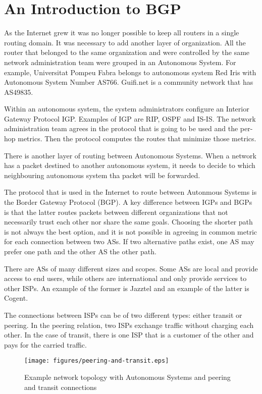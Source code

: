 \chapter{An Introduction to BGP}

As the Internet grew it was no longer possible to keep all routers in a single routing domain.
It was necessary to add another layer of organization.
All the router that belonged to the same organization and were controlled by the same network administration team were grouped in an Autonomous System.
For example, Universitat Pompeu Fabra belongs to autonomous system Red Iris with Autonomous System Number AS766.
Guifi.net is a community network that has AS49835.

Within an autonomous system, the system administrators configure an Interior Gateway Protocol IGP.
Examples of IGP are RIP, OSPF and IS-IS.
The network administration team agrees in the protocol that is going to be used and the per-hop metrics.
Then the protocol computes the routes that minimize those metrics.

There is another layer of routing between Autonomous Systems.
When a network has a packet destined to another autonomous system, it needs to decide to which neighbouring autonomous system tha packet will be forwarded.

The protocol that is used in the Internet to route between Autonmous Systems is the Border Gateway Protocol (BGP).
A key difference between IGPs and BGPs is that the latter routes packets between different organizations that not necessarily trust each other nor share the same goals.
Choosing the shorter path is not always the best option, and it is not possible in agreeing in common metric for each connection between two ASs.
If two alternative paths exist, one AS may prefer one path and the other AS the other path.

There are ASs of many different sizes and scopes.
Some ASs are local and provide access to end users, while others are international and only provide services to other ISPs.
An example of the former is Jazztel and an example of the latter is Cogent.

The connections between ISPs can be of two different types: either transit or peering.
In the peering relation, two ISPs exchange traffic without charging each other.
In the case of transit, there is one ISP that is a customer of the other and pays for the carried traffic.

\begin{figure}[!h]
\centering
\texttt{[image: figures/peering-and-transit.eps]}
\caption{Example network topology with Autonomous Systems and peering and transit connections}
\label{fig:peering-and-transit}
\end{figure}

